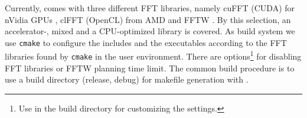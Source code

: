 Currently, \gearshifft{} comes with three different FFT libraries, namely cuFFT (CUDA) for nVidia GPUs \cite{nvidia2010cufft}, clFFT (OpenCL) from AMD \cite{clfft} and FFTW \cite{FFTW05}.
By this selection, an accelerator-, mixed and a CPU-optimized library is covered.
%
As build system we use \texttt{cmake} to configure the includes and the executables according to the FFT libraries found by \texttt{cmake} in the user environment. There are options\footnote{Use  in the build directory for customizing the settings.} for disabling FFT libraries or FFTW planning time limit.
The common build procedure is to use a build directory (release, debug) for makefile generation with .
%

